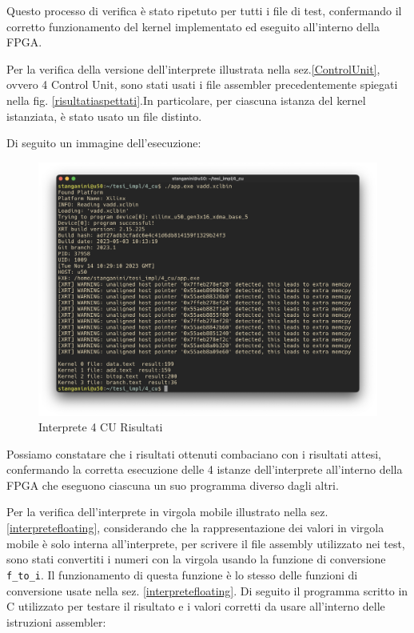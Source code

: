 Questo processo di verifica è stato ripetuto per tutti i file di test, confermando il corretto funzionamento del kernel implementato ed eseguito all'interno della FPGA.

\vspace{0.3cm}


Per la verifica della versione dell'interprete illustrata nella sez.\ref{ControlUnit}, ovvero 4 Control Unit, sono stati usati i file assembler precedentemente spiegati nella fig. \ref{risultatiaspettati}.In particolare, per ciascuna istanza del kernel istanziata, è stato usato un file distinto. 

\vspace{0.3cm}

\noindent Di seguito un immagine dell'esecuzione:

\begin{figure}[h!]
\centering
\includegraphics[scale=0.35]{images/Capitolo5/3_im.png}
\caption{Interprete 4 CU Risultati}
\label{4curisultati}
\end{figure}

\noindent Possiamo constatare che i risultati ottenuti combaciano con i risultati attesi, confermando la corretta esecuzione delle 4 istanze dell'interprete all'interno della FPGA che eseguono ciascuna un suo programma diverso dagli altri.

\vspace{0.3cm}

\noindent Per la verifica dell'interprete in virgola mobile illustrato nella sez. \ref{interpretefloating}, considerando che la rappresentazione dei valori in virgola mobile è solo interna all'interprete, per scrivere il file assembly utilizzato nei test, sono stati convertiti i numeri con la virgola usando la funzione di conversione \texttt{f\_to\_i}. Il funzionamento di questa funzione è lo stesso delle funzioni di conversione usate nella sez. \ref{interpretefloating}. Di seguito il programma scritto in C utilizzato per testare il risultato e i valori corretti da usare all'interno delle istruzioni assembler:

